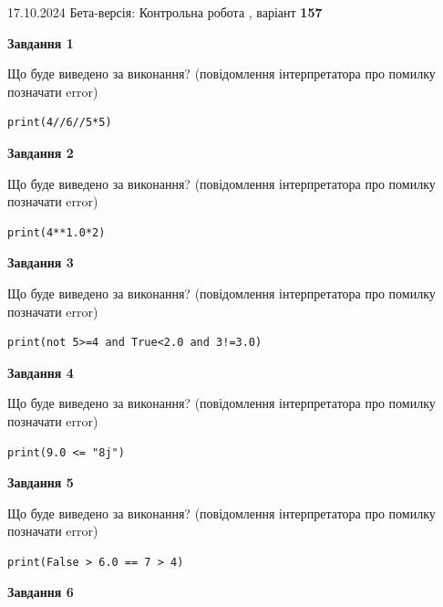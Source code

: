 \documentclass[12pt, ukrainian]{article}
\begin{document}
{\Large{17.10.2024 Бета-версія: Контрольна робота , варіант  \No \textbf { 157 }\par}}
{
\begin {large}
{\begin {center}\textbf{Завдання 1}\end {center}}

Що буде виведено за виконання? (повідомлення інтерпретатора про помилку позначати error)\par
\begin{verbatim}
print(4//6//5*5)
\end{verbatim}

{\begin {center}\textbf{Завдання 2}\end {center}}

Що буде виведено за виконання? (повідомлення інтерпретатора про помилку позначати error)\par
\begin{verbatim}
print(4**1.0*2)
\end{verbatim}

{\begin {center}\textbf{Завдання 3}\end {center}}

Що буде виведено за виконання? (повідомлення інтерпретатора про помилку позначати error)\par
\begin{verbatim}
print(not 5>=4 and True<2.0 and 3!=3.0)
\end{verbatim}

{\begin {center}\textbf{Завдання 4}\end {center}}

Що буде виведено за виконання? (повідомлення інтерпретатора про помилку позначати error)\par
\begin{verbatim}
print(9.0 <= "8j")
\end{verbatim}

{\begin {center}\textbf{Завдання 5}\end {center}}

Що буде виведено за виконання? (повідомлення інтерпретатора про помилку позначати error)\par
\begin{verbatim}
print(False > 6.0 == 7 > 4)
\end{verbatim}

{\begin {center}\textbf{Завдання 6}\end {center}}


\end{large}}
\end{document}
